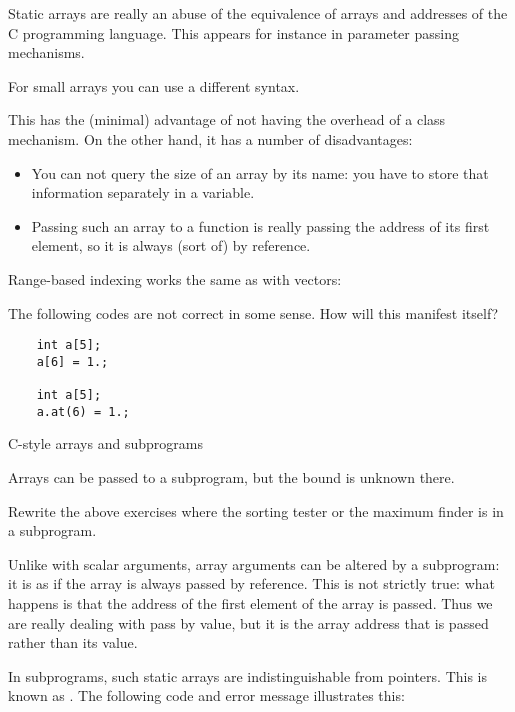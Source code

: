 Static arrays are really an abuse of the equivalence of arrays and
addresses of the C programming language. This appears for instance in
parameter passing mechanisms.

For small arrays you can use a different syntax. 


This has the
(minimal) advantage of not having the overhead of a class
mechanism. On the other hand, it has a number of disadvantages:
\begin{itemize}
\item You can not query the size of an array by its name: you have to
  store that information separately in a variable.
\item Passing such an array to a function is really passing the
  address of its first element, so it is always (sort of) by
  reference.
\end{itemize}

Range-based indexing works the same as with vectors:
%

\begin{review}
  The following codes are not correct in some sense. How will this manifest itself?
  \begin{lstlisting}
    int a[5];
    a[6] = 1.;

    int a[5];
    a.at(6) = 1.;
  \end{lstlisting}
\end{review}

 {C-style arrays and subprograms}

Arrays can be passed to a subprogram, but the bound is unknown there.
%
%
\begin{exercise}
  Rewrite the above exercises where the sorting tester or the maximum
  finder is in a subprogram.
\end{exercise}

Unlike with scalar arguments, array arguments can be altered by a
subprogram: it is as if the array is always passed by reference. This is
not strictly true: what happens is that the address of the first
element of the array is passed. Thus we are really dealing with pass
by value, but it is the array address that is passed rather than its value.

In subprograms, such static arrays are indistinguishable from pointers.
This is known as .
The following code and error message illustrates this:
%

